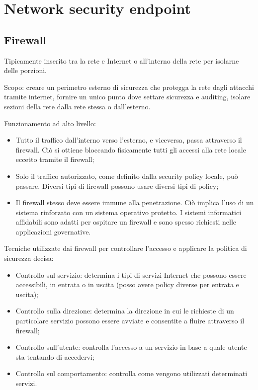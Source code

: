 \setchapterpreamble[u]{\margintoc}
\chapter{Network security endpoint}


\section{Firewall}

Tipicamente inserito tra la rete e Internet o all'interno della rete per isolarne delle porzioni. 

Scopo:  creare un perimetro esterno di sicurezza che protegga la rete dagli attacchi tramite internet, fornire un unico punto dove settare sicurezza e auditing, isolare sezioni della rete dalla rete stessa o dall'esterno.

Funzionamento ad alto livello: 
\begin{itemize}
    \item Tutto il traffico dall'interno verso l'esterno, e viceversa, passa attraverso il firewall. Ciò si ottiene bloccando fisicamente tutti gli accessi alla rete locale eccetto tramite il firewall;
	\item Solo il traffico autorizzato, come definito dalla security policy locale, può passare. Diversi tipi di firewall possono usare diversi tipi di policy;
	\item Il firewall stesso deve essere immune alla penetrazione. Ciò implica l'uso di un sistema rinforzato con un sistema operativo protetto. I sistemi informatici affidabili sono adatti per ospitare un firewall e sono spesso richiesti nelle applicazioni governative.
\end{itemize}

Tecniche utilizzate dai firewall per controllare l'accesso e applicare la politica di sicurezza decisa:
\begin{itemize}
    \item Controllo sul servizio: determina i tipi di servizi Internet che possono essere accessibili, in entrata o in uscita (posso avere policy diverse per entrata e uscita);
	\item Controllo sulla direzione: determina la direzione in cui le richieste di un particolare servizio possono essere avviate e consentite a fluire attraverso il firewall;
	\item Controllo sull'utente: controlla l'accesso a un servizio in base a quale utente sta tentando di accedervi;
	\item Controllo sul comportamento: controlla come vengono utilizzati determinati servizi.
\end{itemize}

